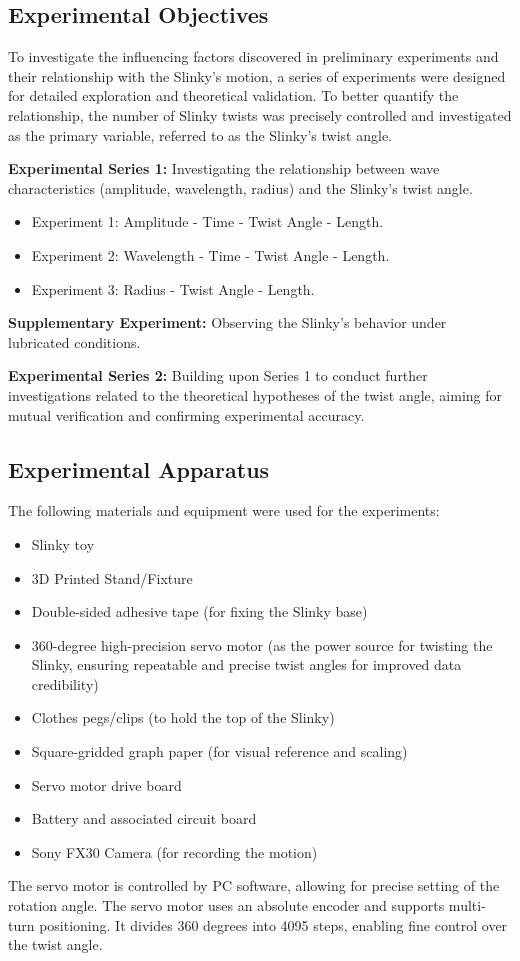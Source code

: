 \documentclass{mcmthesis}  %
\begin{document}
\subsection{Experimental Objectives}
To investigate the influencing factors discovered in preliminary experiments and their relationship with the Slinky's motion, a series of experiments were designed for detailed exploration and theoretical validation. To better quantify the relationship, the number of Slinky twists was precisely controlled and investigated as the primary variable, referred to as the Slinky's twist angle.

\textbf{Experimental Series 1:} Investigating the relationship between wave characteristics (amplitude, wavelength, radius) and the Slinky's twist angle.
\begin{itemize}
    \item Experiment 1: Amplitude - Time - Twist Angle - Length.
    \item Experiment 2: Wavelength - Time - Twist Angle - Length.
    \item Experiment 3: Radius - Twist Angle - Length.
\end{itemize}

\textbf{Supplementary Experiment:} Observing the Slinky's behavior under lubricated conditions.

\textbf{Experimental Series 2:} Building upon Series 1 to conduct further investigations related to the theoretical hypotheses of the twist angle, aiming for mutual verification and confirming experimental accuracy.

\subsection{Experimental Apparatus}
The following materials and equipment were used for the experiments:
\begin{itemize}
    \item Slinky toy
    \item 3D Printed Stand/Fixture
    \item Double-sided adhesive tape (for fixing the Slinky base)
    \item 360-degree high-precision servo motor (as the power source for twisting the Slinky, ensuring repeatable and precise twist angles for improved data credibility)
    \item Clothes pegs/clips (to hold the top of the Slinky)
    \item Square-gridded graph paper (for visual reference and scaling)
    \item Servo motor drive board
    \item Battery and associated circuit board
    \item Sony FX30 Camera (for recording the motion)
\end{itemize}
The servo motor is controlled by PC software, allowing for precise setting of the rotation angle. The servo motor uses an absolute encoder and supports multi-turn positioning. It divides 360 degrees into 4095 steps, enabling fine control over the twist angle.
\end{document}

